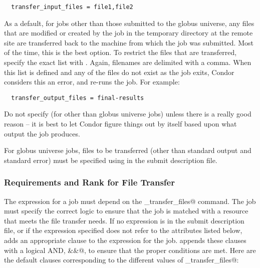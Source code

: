 \begin{verbatim}
  transfer_input_files = file1,file2 
\end{verbatim}

As a default, for jobs other than those submitted to the globus universe,
any files that are modified or created by the job in the
temporary directory at the remote site are transferred back
to the machine from which the job was submitted.
Most of the time, this is the best option.
To restrict the files that are transferred,
specify the exact list with .
Again, filenames are delimited with a comma.
When this list is defined and any of the files do not exist as the
job exits, Condor considers this an error, and re-runs the job.
For example:

\begin{verbatim}
  transfer_output_files = final-results
\end{verbatim}

\Warn Do not specify  (for other than
globus universe jobs) unless there is a
really good reason -- it is best to let Condor figure things out by
itself based upon what output the job produces.

For globus universe jobs, files to be transferred 
(other than standard output and standard error)
must be specified using 
in the submit description file. 

\subsubsection{Requirements and Rank for File Transfer}

The  expression for a job must depend
on the \verb@should_transfer_files@ command.
The job must specify the correct logic to ensure that the job is matched
with a resource that meets the file transfer needs.
If no  expression is in the submit description file,
or if the expression specified does not refer to the
attributes listed below,  adds an
appropriate clause to the  expression for the job.
 appends these clauses with a logical AND, \verb@&&@,
to ensure that the proper conditions are met.
Here are the default clauses corresponding to the different values of
\verb@should_transfer_files@:

